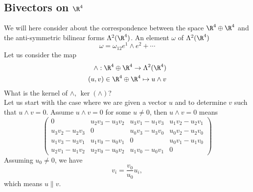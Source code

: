 \documentclass{article}
\newcommand{\AntiSymBiLinear}[2]{\Lambda^{#1}(\R^{#2})}
\newcommand{\WedgeProdComponent}[4]{{#1}_{#3} {#2}_{#4} -  {#1}_{#4} {#2}_{#3}}
\begin{document}
\subsection{Bivectors on $\R^4$}
\label{sec-1-1}
We will here consider about the correspondence between the space $\R^4 \oplus \R^4$ and the anti-symmetric bilinear forms $\AntiSymBiLinear{2}{4}$. An element $\omega$ of $\AntiSymBiLinear{2}{4}$
\begin{equation}
 \omega = \omega_{12} e^1 \wedge e^2 + \cdots  
\end{equation}
Let us consider the map
\begin{eqnarray}
 \wedge : \R^4 \oplus \R^4 \rightarrow \AntiSymBiLinear{2}{4} \\
 (u, v) \in \R^4 \oplus \R^4 \mapsto u \wedge v
\end{eqnarray}
What is the kernel of $\wedge$, $\ker (\wedge)$?\\
Let us start with the case where we are given a vector $u$ and to determine $v$ such that $u \wedge v = 0$. Assume $u \wedge v = 0$ for some $u \ne 0$, then $u \wedge v = 0$ means
\begin{equation}
 \left(
        \begin{array}{cccc}
                0 & \WedgeProdComponent{u}{v}{2}{3} & \WedgeProdComponent{u}{v}{3}{1} & \WedgeProdComponent{u}{v}{1}{2} \\
                \WedgeProdComponent{u}{v}{3}{2} & 0 & \WedgeProdComponent{u}{v}{0}{3} & \WedgeProdComponent{u}{v}{0}{2} \\
                \WedgeProdComponent{u}{v}{1}{3}& \WedgeProdComponent{u}{v}{1}{0} & 0 & \WedgeProdComponent{u}{v}{0}{1} \\
                \WedgeProdComponent{u}{v}{2}{1} & \WedgeProdComponent{u}{v}{2}{0} & \WedgeProdComponent{u}{v}{1}{0} & 0
        \end{array}
 \right)
\end{equation}
Assuming $u_0 \ne 0$, we have
\begin{equation}
 v_i = \frac{v_0}{u_0} u_i,
\end{equation}
which means $u \parallel v$.
\end{document}
